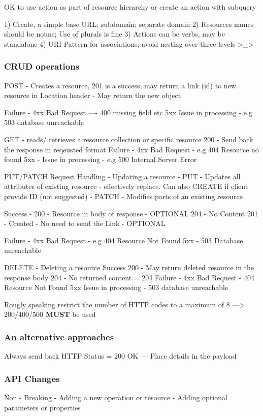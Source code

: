 \documentclass[a4paper, 11pt]{book}
\begin{document}
    OK to use action as part of resource hierarchy or create an action with subquery

    1) Create, a simple base URL; subdomain; separate domain
    2) Resources names should be nouns; Use of plurals is fine
    3) Actions can be verbs, may be standalone
    4) URI Pattern for associations; avoid nesting over three levels >_>

    \subsubsection{CRUD operations}
    POST - Creates a resource,
    201 is a success, may return a link (id) to new resource in Location header
    - May return the new object

    Failure - 4xx Bad Request ---- 400 missing field etc
    5xx Issue in processing - e.g 503 database unreachable

    GET - reads/ retrieves a resource collection or specific resource
    200 - Send back the response in reqeusted format
    Failure - 4xx Bad Request - e.g 404 Resource no found
    5xx - Issue in processing - e.g 500 Internal Server Error

    PUT/PATCH Request Handling - Updating a resource
    - PUT - Updates all attributes of existing resource - effectively replace. Can also CREATE if client provide ID (not suggested)
    - PATCH - Modifies parts of an existing resource

    Success - 200 - Resource in body of response - OPTIONAL
    204 - No Content
    201 - Created - No need to send the Link - OPTIONAL

    Failure - 4xx Bad Request - e.g 404 Resource Not Found
    5xx - 503 Database unreachable

    DELETE - Deleting a resource
    Success 200 - May return deleted resource in the response body
    204 - No returned content = 204
    Failure - 4xx Bad Request - 404 Resource Not Found
    5xx Issue in processing - 503 database unreachable

    Rougly speaking restrict the number of HTTP codes to a maximum of 8
    ---> 200/400/500 \textbf{MUST} be used

    \subsubsection{An alternative approaches}
    Always send back HTTP Status = 200 OK
    --- Place details in the payload

    \subsubsection{API Changes}
    Non - Breaking
    - Adding a new operation or resource
    - Adding optional parameters or properties
\end{document}
